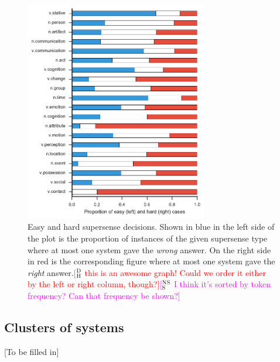 \documentclass[11pt,letterpaper]{article}
\newcommand{\ensuretext}[1]{#1}
\newcommand{\nssmarker}{\ensuretext{\textcolor{magenta}{\ensuremath{^{\textsc{NS}}_{\textsc{S}}}}}}
\newcommand{\dhmarker}{\ensuretext{\textcolor{red}{\ensuremath{^{\textsc{D}}_{\textsc{H}}}}}}
\newcommand{\arkcomment}[3]{\ensuretext{\textcolor{#3}{[#1 #2]}}}
\newcommand{\nss}[1]{\arkcomment{\nssmarker}{#1}{magenta}}
\newcommand{\dirk}[1]{\arkcomment{\dhmarker}{#1}{red}}
\begin{document}
\begin{figure}
		\includegraphics[width=8cm]{figs/proportion_of_easy_and_hard_supersenses.pdf}
	\caption{Easy and hard supersense decisions. Shown in blue in the left side of the plot is the proportion of instances of the given supersense type where at most one system gave the \emph{wrong} answer. On the right side in red is the corresponding figure where at most one system gave the \emph{right} answer.\dirk{this is an awesome graph! Could we order it either by the left or right column, though?}\nss{I think it's sorted by token frequency? Can that frequency be shown?}}
	\label{fig:easy-and-hard-supersenses}
\end{figure}


\subsection{Clusters of systems}

[To be filled in]
\end{document}
